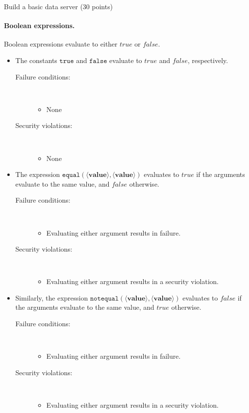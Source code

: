 \documentclass[11pt]{article}
\newcommand{\true}{\ensuremath{\mathit{true}}\xspace}
\newcommand{\false}{\ensuremath{\mathit{false}}\xspace}
\begin{document}
\begin{problem}{Build a basic data server (30 points)}
\paragraph{Boolean expressions.} Boolean expressions evaluate to either \true or \false.
\begin{itemize}
\item The constants $\mathtt{true}$ and $\mathtt{false}$ evaluate to \true and \false, respectively.
\begin{description}
\item[Failure conditions:]\ \\[-1.5em]
\begin{itemize}
\item None
\end{itemize}
\item[Security violations:]\ \\[-1.5em]
\begin{itemize}
\item None
\end{itemize}
\end{description}
\item The expression $\mathtt{equal}(\langle\mathbf{value}\rangle,\langle\mathbf{value}\rangle)$ evaluates to \true if the arguments evaluate to the same value, and \false otherwise.
\begin{description}
\item[Failure conditions:]\ \\[-1.5em]
\begin{itemize}
\item Evaluating either argument results in failure.
\end{itemize}
\item[Security violations:]\ \\[-1.5em]
\begin{itemize}
\item Evaluating either argument results in a security violation.
\end{itemize}
\end{description}
\item Similarly, the expression $\mathtt{notequal}(\langle\mathbf{value}\rangle,\langle\mathbf{value}\rangle)$ evaluates to \false if the arguments evaluate to the same value, and \true otherwise.
\begin{description}
\item[Failure conditions:]\ \\[-1.5em]
\begin{itemize}
\item Evaluating either argument results in failure.
\end{itemize}
\item[Security violations:]\ \\[-1.5em]
\begin{itemize}
\item Evaluating either argument results in a security violation.
\end{itemize}
\end{description}
\end{itemize}


\end{problem}
\end{document}
